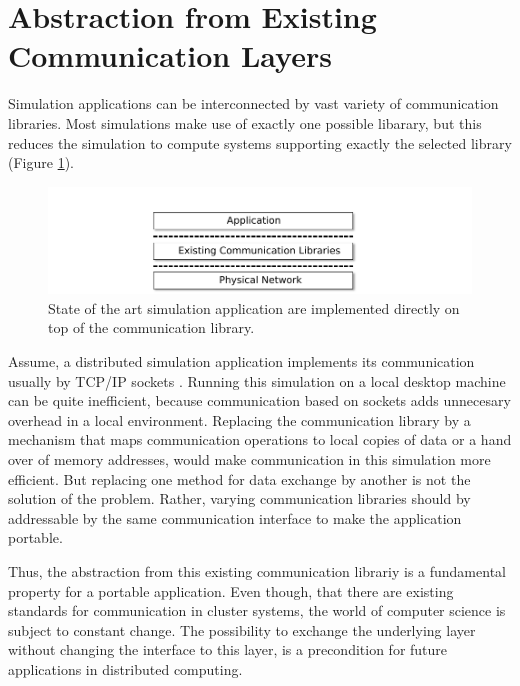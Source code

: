 \section{Abstraction from Existing Communication Layers}
\label{sec:comm_abstraction}

Simulation applications can be interconnected by vast variety of
communication libraries. Most simulations make use of exactly one
possible libarary, but this reduces the simulation to compute systems
supporting exactly the selected library (Figure \ref{fig:design_state_of_the_art}).

\begin{figure}[H]
  \centering \includegraphics[width=\textwidth]{graphics/30_design_state_of_the_art}
  \caption{State of the art simulation application are implemented directly
  on top of the communication library.}
  \label{fig:design_state_of_the_art}
\end{figure}


Assume, a distributed simulation application implements its
communication usually by TCP/IP sockets . Running this simulation on a
local desktop machine can be quite inefficient, because communication
based on sockets adds unnecesary overhead in a local
environment. Replacing the communication library by a mechanism that
maps communication operations to local copies of data or a hand over
of memory addresses, would make communication in this simulation more
efficient. But replacing one method for data exchange by another is
not the solution of the problem. Rather, varying communication
libraries should by addressable by the same communication interface to
make the application portable.

Thus, the abstraction from this existing communication librariy is a
fundamental property for a portable application.  Even though, that
there are existing standards for communication in cluster systems, the
world of computer science is subject to constant change. The
possibility to exchange the underlying layer without changing the
interface to this layer, is a precondition for future applications in
distributed computing.

